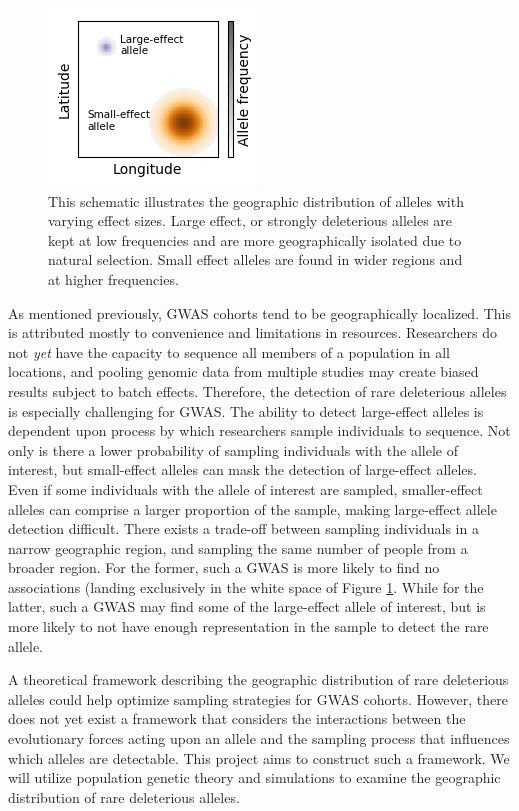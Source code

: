 \begin{figure}[h]
    \centering
\includegraphics[scale=1.5]{img/spatial_distributions.png}
    \caption{This schematic illustrates the geographic distribution of alleles with varying effect sizes. Large effect, or strongly deleterious alleles are kept at low frequencies and are more geographically isolated due to natural selection. Small effect alleles are found in wider regions and at higher frequencies.}
    \label{fig:spatial_schematic}
\end{figure}


As mentioned previously, GWAS cohorts tend to be geographically localized. This is attributed mostly to convenience and limitations in resources. Researchers do not \textit{yet} have the capacity to sequence all members of a population in all locations, and pooling genomic data from multiple studies may create biased results subject to batch effects. \cite{woolston_2015}\cite{gilad_2015} Therefore, the detection of rare deleterious alleles is especially challenging for GWAS. The ability to detect large-effect alleles is dependent upon process by which researchers sample individuals to sequence. Not only is there a lower probability of sampling individuals with the allele of interest, but small-effect alleles can mask the detection of large-effect alleles. Even if some individuals with the allele of interest are sampled, smaller-effect alleles can comprise a larger proportion of the sample, making large-effect allele detection difficult. There exists a trade-off between sampling individuals in a narrow geographic region, and sampling the same number of people from a broader region. For the former, such a GWAS is more likely to find no associations (landing exclusively in the white space of Figure \ref{fig:spatial_schematic}. While for the latter, such a GWAS may find some of the large-effect allele of interest, but is more likely to not have enough representation in the sample to detect the rare allele. 


A theoretical framework describing the geographic distribution of rare deleterious alleles could help optimize sampling strategies for GWAS cohorts. However, there does not yet exist a framework that considers the interactions between the evolutionary forces acting upon an allele and the sampling process that influences which alleles are detectable. This project aims to construct such a framework. We will utilize population genetic theory and simulations to examine the geographic distribution of rare deleterious alleles. 


